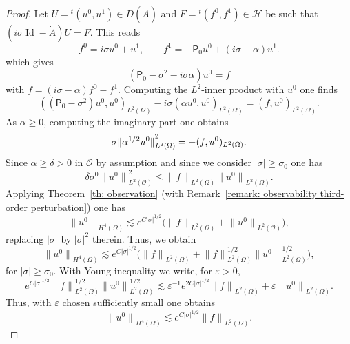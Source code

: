 \documentclass[JEP,XML,SOM,Unicode,published]{cedram}
\theoremstyle{plain}
\theoremstyle{definition}
\newcommand{\suff}{sufficiently\xspace}
\let\eps\varepsilon
\let \Im \relax
\DeclareMathOperator{\Im}{Im}
\newcommand{\inp}[2]{(#1, #2)}
\renewcommand{\H}{{\mathcal H}}
\newcommand{\scrO}{\mathscr O}
\newcommand{\transp}{\ensuremath{\phantom{}^{t}}}
\newcommand{\Norm}[2]{{\| #1 \|}_{#2}}
\newcommand{\Pell}{\mathsf P_0}
\DeclareMathOperator{\id}{Id}
\begin{document}
\begin{proof}
Let $U= \transp (u^0,u^1)\in D(\dot A)$ and $F= \transp (f^0,f^1)\in \dot{\H}$ be such that
$(i\sigma\id-\dot{A}) U=F$. This reads
\begin{equation*}
f^0=i\sigma u^0+u^1,
\qquad
f^1=-\Pell u^0+(i\sigma-\alpha)u^1.
\end{equation*}
which gives
\begin{equation*}
(\Pell -\sigma^2-i\sigma\alpha)u^0=f
\end{equation*}
with $f=(i\sigma-\alpha)f^0-f^1$. Computing the $L^2$-inner product
with $u^0$ one finds
\begin{equation*}
\inp{(\Pell - \sigma^2) u^0}{u^0}_{L^2(\Omega)}
- i \sigma \inp{\alpha u^0}{u^0}_{L^2(\Omega)}
= \inp{f}{u^0}_{L^2(\Omega)}.
\end{equation*}
As $\alpha \geq 0$, computing the imaginary part one obtains
\begin{equation*}
\sigma \Norm{\alpha^{1/2} u^0}{L^2(\Omega)}^2
=-\Im \inp{f}{u^0}_{L^2(\Omega)}.
\end{equation*}
Since $\alpha\geq \delta>0$ in $\scrO$ by assumption and since we consider
$|\sigma| \geq \sigma_0$ one has
\begin{equation*}
\delta \sigma^0 \Norm{u^0}{L^2(\scrO)}^2
\leq \Norm{f}{L^2(\Omega)}
\Norm{u^0}{L^2(\Omega)}.
\end{equation*}
Applying Theorem~\ref{th: observation} (with Remark~\ref{remark: observability third-order perturbation}) one has
\begin{equation*}
\Norm{u^0}{H^4(\Omega)}
\lesssim e^{C|\sigma|^{1/2}}
\big(\Norm{f}{L^2(\Omega)}+\Norm{u^0}{L^2(\scrO)}
\big),
\end{equation*}
replacing $|\sigma|$ by $|\sigma|^2$ therein.
Thus, we obtain
\begin{equation*}
\Norm{u^0}{H^4(\Omega)}
\lesssim e^{C|\sigma|^{1/2}}
\big(\Norm{f}{L^2(\Omega)}+\Norm{f}{L^2(\Omega)}^{1/2}
\Norm{u^0}{L^2(\Omega)}^{1/2}
\big),
\end{equation*}
for $|\sigma| \geq \sigma_0$.
With Young inequality we write, for $\eps>0$,
\begin{equation*}
e^{C|\sigma|^{1/2}}\Norm{f}{L^2(\Omega)}^{1/2}
\Norm{u^0}{L^2(\Omega)}^{1/2}
\lesssim \eps^{-1}e^{2C|\sigma|^{1/2}}\Norm{f}{L^2(\Omega)}
+ \eps \Norm{u^0}{L^2(\Omega)}.
\end{equation*}
Thus, with $\eps$ chosen \suff small one obtains
\begin{equation*}
\Norm{u^0}{H^4(\Omega)}
\lesssim e^{C|\sigma|^{1/2}}
\Norm{f}{L^2(\Omega)}.
\end{equation*}

\end{proof}
\end{document}
